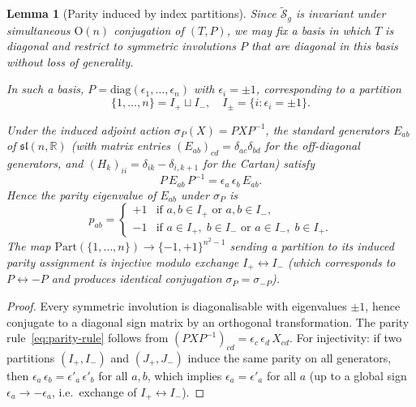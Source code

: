 \documentclass[11pt]{article}
\theoremstyle{plain}
\newtheorem{lemma}[theorem]{Lemma}
\theoremstyle{definition}
\theoremstyle{remark}
\newcommand{\sln}[1]{\mathfrak{sl}(#1,\mathbb{R})}
\begin{document}
\begin{lemma}[Parity induced by index partitions]
\label{lem:partition}
Since $\widetilde{\mathcal{S}}_g$ is invariant under simultaneous $\mathrm{O}(n)$
conjugation of $(T, P)$, we may fix a basis in which $T$ is diagonal
and restrict to symmetric involutions $P$ that are diagonal in this
basis without loss of generality.

In such a basis, $P = \mathrm{diag}(\epsilon_1,\dots,\epsilon_n)$
with $\epsilon_i = \pm 1$, corresponding to a partition
\[
  \{1,\dots,n\} = I_+ \sqcup I_-,
  \quad I_\pm = \{i : \epsilon_i = \pm 1\}.
\]

Under the induced adjoint action $\sigma_P(X) = PXP^{-1}$, the
standard generators $E_{ab}$ of $\sln{n}$ (with matrix entries
$(E_{ab})_{cd} = \delta_{ac}\delta_{bd}$ for the off-diagonal
generators, and $(H_k)_{ii} = \delta_{ik} - \delta_{i,k+1}$
for the Cartan) satisfy
\begin{equation}\label{eq:parity-rule}
  P\,E_{ab}\,P^{-1} = \epsilon_a\,\epsilon_b\,E_{ab}.
\end{equation}
Hence the parity eigenvalue of $E_{ab}$ under $\sigma_P$ is
\[
  p_{ab} =
  \begin{cases}
    +1 & \text{if } a, b \in I_+ \text{ or } a, b \in I_-,
    \\[2pt]
    -1 & \text{if } a \in I_+,\; b \in I_-
          \text{ or } a \in I_-,\; b \in I_+.
  \end{cases}
\]
The map
$\mathrm{Part}(\{1,\dots,n\}) \to \{-1,+1\}^{n^2-1}$
sending a partition to its induced parity assignment is injective
modulo exchange $I_+ \leftrightarrow I_-$ (which corresponds to
$P \leftrightarrow -P$ and produces identical conjugation
$\sigma_P = \sigma_{-P}$).
\end{lemma}

\begin{proof}
Every symmetric involution is diagonalisable with eigenvalues
$\pm 1$, hence conjugate to a diagonal sign matrix by an
orthogonal transformation.  The parity rule~\eqref{eq:parity-rule}
follows from $(PXP^{-1})_{cd} = \epsilon_c\,\epsilon_d\,X_{cd}$.
For injectivity: if two partitions $(I_+, I_-)$ and $(J_+, J_-)$
induce the same parity on all generators, then
$\epsilon_a\,\epsilon_b = \epsilon'_a\,\epsilon'_b$ for all $a,b$,
which implies $\epsilon_a = \epsilon'_a$ for all $a$ (up to a
global sign $\epsilon_a \to -\epsilon_a$, i.e.\ exchange of
$I_+ \leftrightarrow I_-$).
\end{proof}
\end{document}
